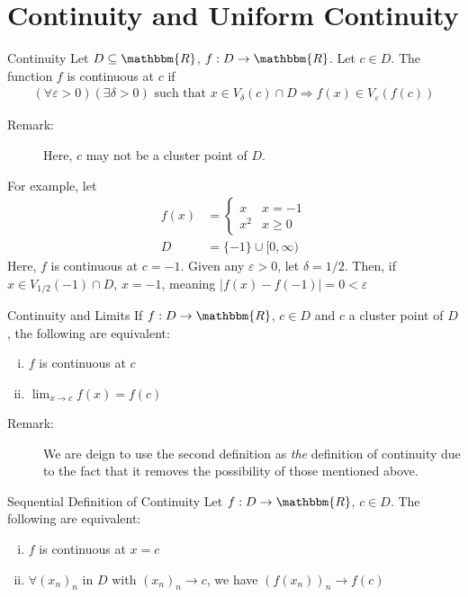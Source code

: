 \documentclass[10pt]{extarticle}
\newcommand{\R}{\mathbbm{R}}
\begin{document}
  \section{Continuity and Uniform Continuity}%
  \begin{problem}{Continuity}
    Let $D\subseteq \R$, $f: D\rightarrow \R$. Let $c\in D$. The function $f$ is continuous at $c$ if
    \begin{align*}
      (\forall \varepsilon > 0)(\exists \delta > 0) \text{ such that } x\in V_{\delta}(c) \cap D \Rightarrow f(x) \in V_{\varepsilon}(f(c))
    \end{align*}
    \begin{description}
      \item[Remark:] Here, $c$ may not be a cluster point of $D$.
    \end{description}
    For example, let
    \begin{align*}
      f(x) &= \begin{cases}
        x & x = -1\\
        x^2 & x \geq 0
      \end{cases}\\
        D &= \{-1\} \cup [0,\infty)
    \end{align*}
    Here, $f$ is continuous at $c = -1$. Given any $\varepsilon > 0$, let $\delta = 1/2$. Then, if $x\in V_{1/2}(-1)\cap D$, $x = -1$, meaning $|f(x) - f(-1)| = 0 < \varepsilon$
  \end{problem}
  \begin{problem}{Continuity and Limits}
    If $f: D\rightarrow \R$, $c\in D$ and $c$ a cluster point of $D$, the following are equivalent:
    \begin{enumerate}[(i)]
      \item $f$ is continuous at $c$
      \item $\lim_{x\rightarrow c} f(x) = f(c)$
    \end{enumerate}
    \begin{description}
      \item[Remark:] We are deign to use the second definition as \textit{the} definition of continuity due to the fact that it removes the possibility of those mentioned above.
    \end{description}
  \end{problem}
  \begin{problem}{Sequential Definition of Continuity}
    Let $f:D\rightarrow \R$, $c\in D$. The following are equivalent:
    \begin{enumerate}[(i)]
      \item $f$ is continuous at $x = c$
      \item $\forall (x_n)_n$ in $D$ with $(x_n)_n \rightarrow c$, we have $(f(x_n))_n \rightarrow f(c)$
    \end{enumerate}
  \end{problem}
\end{document}
